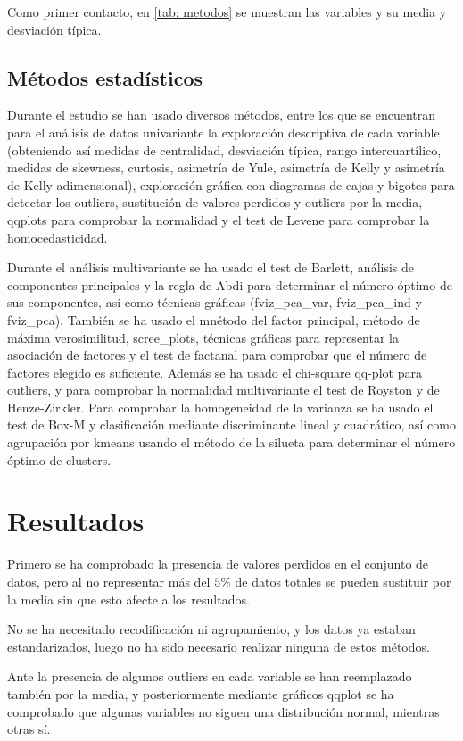 \documentclass[twoside,openright,titlepage,numbers=noenddot,openany,headinclude,footinclude=true,
cleardoublepage=empty,abstractoff,BCOR=5mm,paper=a4,fontsize=12pt,main=spanish]{scrreprt}
\begin{document}
Como primer contacto, en \eqref{tab: metodos} se muestran las variables y su media y desviación típica.

\subsection{Métodos estadísticos}

Durante el estudio se han usado diversos métodos, entre los que se encuentran para el análisis de datos univariante la exploración descriptiva de cada variable (obteniendo así medidas de centralidad, desviación típica, rango intercuartílico, medidas de skewness, curtosis, asimetría de Yule, asimetría de Kelly y asimetría de Kelly adimensional), exploración gráfica con diagramas de cajas y bigotes para detectar los outliers, sustitución de valores perdidos y outliers por la media, qqplots para comprobar la normalidad y el test de Levene para comprobar la homocedasticidad.

Durante el análisis multivariante se ha usado el test de Barlett, análisis de componentes principales y la regla de Abdi para determinar el número óptimo de sus componentes, así como técnicas gráficas (fviz\_pca\_var, fviz\_pca\_ind y fviz\_pca). También se ha usado el mnétodo del factor principal, método de máxima verosimilitud, scree\_plots, técnicas gráficas para representar la asociación de factores y el test de factanal para comprobar que el número de factores elegido es suficiente. Además se ha usado el chi-square qq-plot para outliers, y para comprobar la normalidad multivariante el test de Royston y de Henze-Zirkler. Para comprobar la homogeneidad de la varianza se ha usado el test de Box-M y clasificación mediante discriminante lineal y cuadrático, así como agrupación por kmeans usando el método de la silueta para determinar el número óptimo de clusters.

\section{Resultados}

Primero se ha comprobado la presencia de valores perdidos en el conjunto de datos, pero al no representar más del $5\% $ de datos totales se pueden sustituir por la media sin que esto afecte a los resultados.

No se ha necesitado recodificación ni agrupamiento, y los datos ya estaban estandarizados, luego no ha sido necesario realizar ninguna de estos métodos.

Ante la presencia de algunos outliers en cada variable se han reemplazado también por la media, y posteriormente mediante gráficos qqplot se ha comprobado que algunas variables no siguen una distribución normal, mientras otras sí.
\end{document}
